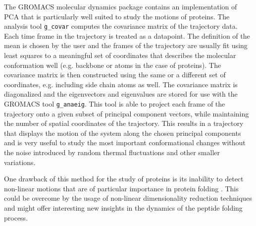 \documentclass[english, a4paper, 12pt, titlepage, draft]{article}
\begin{document}
The GROMACS molecular dynamics package \cite{GROMACS4} contains an implementation of PCA that is particularly well suited to study the motions of proteins.
The analysis tool \texttt{g\_covar} computes the covariance matrix of the trajectory data.
Each time frame in the trajectory is treated as a datapoint.
The definition of the mean is chosen by the user and the frames of the trajectory are usually fit using least squares to a meaningful set of coordinates that describes the molecular conformation well (e.g. backbone or  atoms in the case of proteins).
The covariance matrix is then constructed using the same or a different set of coordinates, e.g. including side chain atoms as well.
The covariance matrix is diagonalized and the eigenvectors and eigenvalues are stored for use with the GROMACS tool \texttt{g\_anaeig}.
This tool is able to project each frame of the trajectory onto a given subset of principal component vectors, while maintaining the number of spatial coordinates of the trajectory.
This results in a trajectory that displays the motion of the system along the chosen principal components and is very useful to study the most important conformational changes without the noise introduced by random thermal fluctuations and other smaller variations.

One drawback of this method for the study of proteins is its inability to detect non-linear motions that are of particular importance in protein folding \cite{SciMAP}.
This could be overcome by the usage of non-linear dimensionality reduction techniques and might offer interesting new insights in the dynamics of the peptide folding process.
\end{document}
